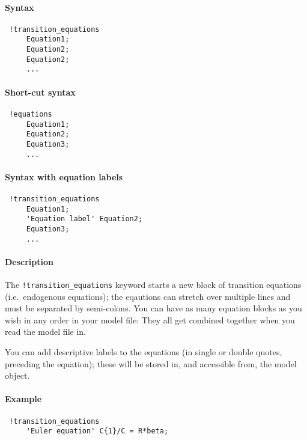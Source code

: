 


	\paragraph{Syntax}
 
 \begin{verbatim}
 !transition_equations
     Equation1;
     Equation2;
     Equation2;
     ...
 \end{verbatim}
 
 \paragraph{Short-cut syntax}
 
 \begin{verbatim}
 !equations
     Equation1;
     Equation2;
     Equation3;
     ...
 \end{verbatim}
 
 \paragraph{Syntax with equation labels}
 
 \begin{verbatim}
 !transition_equations
     Equation1;
     'Equation label' Equation2;
     Equation3;
     ...
 \end{verbatim}
 
 \paragraph{Description}
 
 The \texttt{!transition\_equations} keyword starts a new block of
 transition equations (i.e.~endogenous equations); the eqautions can
 stretch over multiple lines and must be separated by semi-colons. You
 can have as many equation blocks as you wish in any order in your model
 file: They all get combined together when you read the model file in.
 
 You can add descriptive labels to the equations (in single or double
 quotes, preceding the equation); these will be stored in, and accessible
 from, the model object.
 
 \paragraph{Example}
 
 \begin{verbatim}
 !transition_equations
     'Euler equation' C{1}/C = R*beta;
 \end{verbatim}


